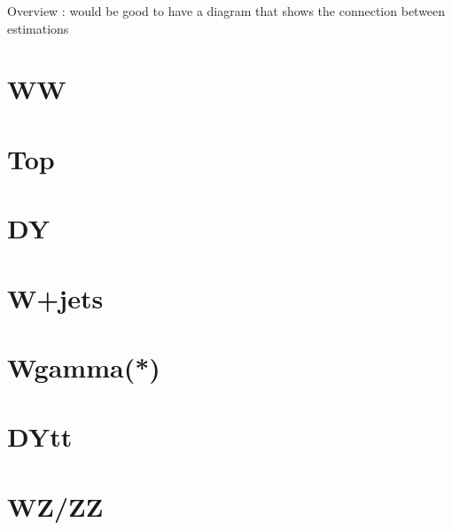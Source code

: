 Overview : would be good to have a diagram that shows the connection between estimations
\section{ WW }
\section{ Top }
\section{ DY }
\section{ W+jets }
\section{ Wgamma(*) }
\section{ DYtt }
\section{ WZ/ZZ }

